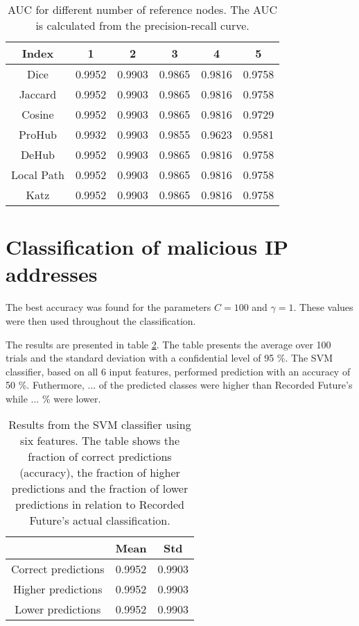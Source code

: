 \begin{table}[h!]
    \centering
    \caption{AUC for different number of reference nodes. The AUC is calculated from the precision-recall curve.}
    \begin{tabular}{|c|c|c|c|c|c|} %
    \hline
        Index   & 1 & 2 & 3 & 4 & 5 \\ \hline
        Dice    & 0.9952 &  0.9903  & 0.9865 & 0.9816 & 0.9758 \\
        Jaccard & 0.9952 &  0.9903  & 0.9865 & 0.9816 & 0.9758\\
        Cosine  & 0.9952 &  0.9903  & 0.9865 & 0.9816 & 0.9729 \\
        ProHub  & 0.9932 &  0.9903  & 0.9855 & 0.9623 & 0.9581 \\
        DeHub   & 0.9952 &  0.9903  & 0.9865 & 0.9816 & 0.9758 \\
        Local Path   & 0.9952 &  0.9903  & 0.9865 & 0.9816 & 0.9758 \\
        Katz   & 0.9952 &  0.9903  & 0.9865 & 0.9816 & 0.9758 \\ \hline
    \end{tabular}
    \label{aucIndex2}
\end{table}

\section{Classification of malicious IP addresses}

The best accuracy was found for the parameters $C=100$ and $\gamma=1$. These values were then used throughout the classification. 

The results are presented in table \ref{IpRes}. The table presents the average over 100 trials and the standard deviation with a confidential level of 95 \%. The SVM classifier, based on all 6 input features, performed prediction with an accuracy of 50 \%. Futhermore, ... of the predicted classes were higher than Recorded Future's while ... \% were lower. 

\begin{table}[h!]
    \centering
    \caption{Results from the SVM classifier using six features. The table shows the fraction of correct predictions (accuracy), the fraction of higher predictions and the fraction of lower predictions in relation to Recorded Future's actual classification.}
    \begin{tabular}{|c|c|c|}
    \hline
        ~   & Mean & Std  \\ \hline
        Correct predictions & 0.9952 &  0.9903 \\
        Higher predictions  & 0.9952 &  0.9903\\
        Lower predictions   & 0.9952 &  0.9903\\ \hline
    \end{tabular}
    \label{IpRes}
\end{table}


